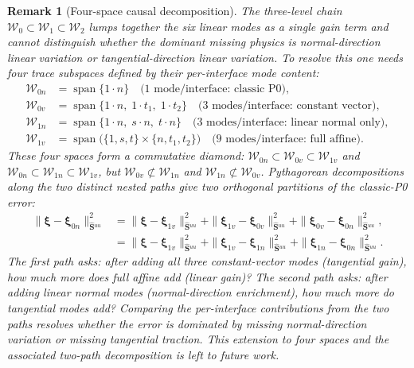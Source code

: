 \documentclass[11pt,a4paper]{article}
\newtheorem{remark}[theorem]{Remark}
\theoremstyle{definition}
\newcommand{\Schur}{\mathbf{S}}
\newcommand{\Shatuu}{\widehat{\Schur}{}^{uu}}
\newcommand{\Wspace}{\mathcal{W}}
\begin{document}
\begin{remark}[Four-space causal decomposition]\label{rem:four-space}
  The three-level chain $\Wspace_0\subset\Wspace_1\subset\Wspace_2$
  lumps together the six linear modes as a single gain term and cannot
  distinguish whether the dominant missing physics is normal-direction
  linear variation or tangential-direction linear variation.
  To resolve this one needs four trace subspaces defined by their
  per-interface mode content:
  \begin{align*}
    \Wspace_{0n} &= \operatorname{span}\{1\cdot n\}
      \quad\text{(1 mode/interface: classic P0)},\\
    \Wspace_{0v} &= \operatorname{span}\{1\cdot n,\;1\cdot t_1,\;1\cdot t_2\}
      \quad\text{(3 modes/interface: constant vector)},\\
    \Wspace_{1n} &= \operatorname{span}\{1\cdot n,\;s\cdot n,\;t\cdot n\}
      \quad\text{(3 modes/interface: linear normal only)},\\
    \Wspace_{1v} &= \operatorname{span}\bigl(\{1,s,t\}\times\{n,t_1,t_2\}\bigr)
      \quad\text{(9 modes/interface: full affine)}.
  \end{align*}
  These four spaces form a commutative diamond:
  $\Wspace_{0n}\subset\Wspace_{0v}\subset\Wspace_{1v}$ \emph{and}
  $\Wspace_{0n}\subset\Wspace_{1n}\subset\Wspace_{1v}$,
  but $\Wspace_{0v}\not\subset\Wspace_{1n}$ and
  $\Wspace_{1n}\not\subset\Wspace_{0v}$.
  Pythagorean decompositions along the two distinct nested paths give
  two orthogonal partitions of the classic-P0 error:
  \[
  \begin{aligned}
  \|\bm{\xi}-\bm{\xi}_{0n}\|_{\Shatuu}^2
  &= \|\bm{\xi}-\bm{\xi}_{1v}\|_{\Shatuu}^2
   + \|\bm{\xi}_{1v}-\bm{\xi}_{0v}\|_{\Shatuu}^2
   + \|\bm{\xi}_{0v}-\bm{\xi}_{0n}\|_{\Shatuu}^2,\\
  &= \|\bm{\xi}-\bm{\xi}_{1v}\|_{\Shatuu}^2
   + \|\bm{\xi}_{1v}-\bm{\xi}_{1n}\|_{\Shatuu}^2
   + \|\bm{\xi}_{1n}-\bm{\xi}_{0n}\|_{\Shatuu}^2.
  \end{aligned}
  \]
  The first path asks: after adding all three constant-vector modes
  (tangential gain), how much more does full affine add (linear gain)?
  The second path asks: after adding linear normal modes
  (normal-direction enrichment), how much more do tangential modes add?
  Comparing the per-interface contributions from the two paths resolves
  whether the error is dominated by missing normal-direction variation
  or missing tangential traction.  This extension to four spaces and the
  associated two-path decomposition is left to future work.
\end{remark}
\end{document}
